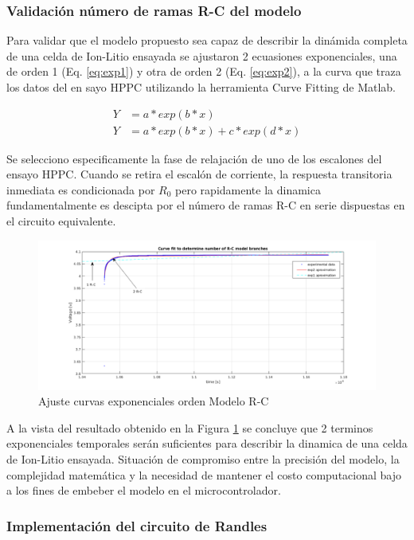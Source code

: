 \documentclass[10pt,a4paper]{article}
\begin{document}
\subsubsection{Validación número de ramas R-C del modelo}

Para validar que el modelo propuesto sea capaz de describir la dinámida completa
de una celda de Ion-Litio ensayada se ajustaron 2 ecuasiones exponenciales, una
de orden 1 (Eq. \ref{eq:exp1}) y otra de orden 2 (Eq. \ref{eq:exp2}), a la curva
que traza los datos del en sayo HPPC utilizando la herramienta Curve Fitting de
Matlab.

\begin{align}
    Y &= a*exp(b*x)\label{eq:exp1}\\
    Y &= a*exp(b*x)+c*exp(d*x)\label{eq:exp2}
\end{align}

Se selecciono especificamente la fase de relajación de uno de los escalones del
ensayo HPPC. Cuando se retira el escalón de corriente, la respuesta transitoria
inmediata es condicionada por $R_{0}$ pero rapidamente la dinamica
fundamentalmente es descipta por el número de ramas R-C en serie dispuestas en
el circuito equivalente. 

\begin{figure}[h!]
    \begin{center}
        \includegraphics[width=.65\textwidth]{rc_model_fit.png}
        \caption{Ajuste curvas exponenciales orden Modelo R-C}
        \label{fig:model_fit}
    \end{center}
\end{figure}
\FloatBarrier

A la vista del resultado obtenido en la Figura \ref{fig:model_fit} se concluye
que 2 terminos exponenciales temporales serán suficientes para describir la
dinamica de una celda de Ion-Litio ensayada. Situación de compromiso entre
la precisión del modelo, la complejidad matemática y la necesidad de mantener el
costo computacional bajo a los fines de embeber el modelo en el
microcontrolador. 

\subsubsection{Implementación del circuito de Randles}
\end{document}
